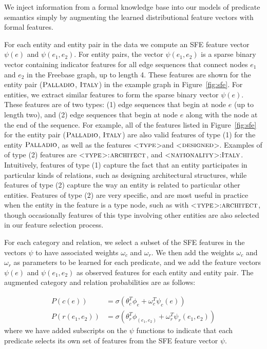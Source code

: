 \documentclass[11pt]{article}
\newcommand{\figref}[1]{Figure~\ref{fig:#1}}
\newcommand{\predicate}[1]{\ensuremath{\textsc{#1}}}
\newcommand{\entity}[1]{\ensuremath{\textsc{#1}}}
\begin{document}
We inject information from a formal knowledge base into our models of predicate
semantics simply by augmenting the learned distributional feature vectors with
formal features.

For each entity and entity pair in the data we compute an SFE feature vector
$\psi(e)$ and $\psi(e_1, e_2)$.  For entity pairs, the vector $\psi(e_1, e_2)$
is a sparse binary vector containing indicator features for all edge sequences
that connect nodes $e_1$ and $e_2$ in the Freebase graph, up to length 4.
These features are shown for the entity pair (\entity{Palladio},
\entity{Italy}) in the example graph in \figref{sfe}.  For entities, we extract
similar features to form the sparse binary vector $\psi(e)$.  These features
are of two types: (1) edge sequences that begin at node $e$ (up to length two),
and (2) edge sequences that begin at node $e$ along with the node at the end of
the sequence.  For example, all of the features listed in \figref{sfe} for the
entity pair (\entity{Palladio}, \entity{Italy}) are also valid features of type
(1) for the entity \entity{Palladio}, as well as the features
\textless\predicate{type}\textgreater and
\textless\predicate{designed}\textgreater.  Examples of of type (2) features
are \textless\predicate{type}\textgreater:\entity{architect}, and
\textless\predicate{nationality}\textgreater:\entity{Italy}.  Intuitively,
features of type (1) capture the fact that an entity participates in particular
kinds of relations, such as designing architectural structures, while features
of type (2) capture the way an entity is related to particular other entities.
Features of type (2) are very specific, and are most useful in practice when
the entity in the feature is a type node, such as with
\textless\predicate{type}\textgreater:\entity{architect}, though occasionally
features of this type involving other entities are also selected in our feature
selection process.

For each category and relation, we select a subset of the SFE features in the
vectors $\psi$ to have associated weights $\omega_c$ and $\omega_r$.  We then
add the weights $\omega_c$ and $\omega_r$ as parameters to be learned for each
predicate, and we add the feature vectors $\psi(e)$ and $\psi(e_1, e_2)$ as
observed features for each entity and entity pair.  The augmented category and
relation probabilities are as follows:

\begin{align*}
  P(c(e)) &= \sigma ( \theta_c^T \phi_e + \omega_c^T \psi_c(e)) \\
  P(r(e_1, e_2)) &= \sigma ( \theta_r^T \phi_{(e_1, e_2)} + \omega_r^T \psi_r(e_1, e_2) )
\end{align*}
where we have added subscripts on the $\psi$ functions to indicate that each
predicate selects its own set of features from the SFE feature vector $\psi$.
\end{document}
